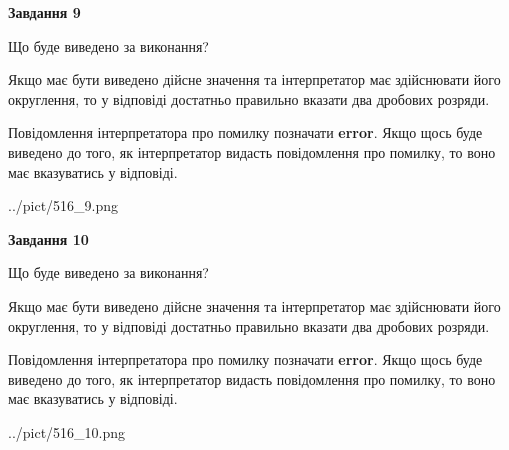 \documentclass[12pt, ukrainian]{article}
\begin{document}
{\begin {Large}
{\begin {center}\textbf{Завдання 9}\end {center}}\par
Що буде виведено за виконання? \par

Якщо має бути виведено дійсне значення та інтерпретатор має здійснювати його округлення, 
то у відповіді достатньо правильно вказати два дробових розряди.

Повідомлення інтерпретатора про помилку позначати \textbf{error}.
Якщо щось буде виведено до того, як інтерпретатор видасть повідомлення про помилку, 
то воно має вказуватись у відповіді. \par

\begin{center}
	{../pict/516_9.png}
\end{center}
\newpage

{\begin {center}\textbf{Завдання 10}\end {center}}\par
Що буде виведено за виконання? \par

Якщо має бути виведено дійсне значення та інтерпретатор має здійснювати його округлення, 
то у відповіді достатньо правильно вказати два дробових розряди.

Повідомлення інтерпретатора про помилку позначати \textbf{error}.
Якщо щось буде виведено до того, як інтерпретатор видасть повідомлення про помилку, 
то воно має вказуватись у відповіді. \par

\begin{center}
	{../pict/516_10.png}
\end{center}
\newpage

\end {Large}}
\end{document}

